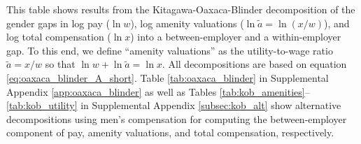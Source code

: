 %
\begin{table}[htbp!]
    \caption{Kitagawa-Oaxaca-Blinder decompositions of gaps in pay, amenity valuations, and total compensation}
    \label{tab:oaxaca_blinder_all}
    \resizebox{\textwidth}{!}{%
    
    }
    \begin{tablenotes}
        \footnotesize
        This table shows results from the Kitagawa-Oaxaca-Blinder decomposition of the gender gaps in log pay ($\ln w$), log amenity valuations ($\ln \tilde{a} = \ln(x/w)$), and log total compensation ($\ln x$) into a between-employer and a within-employer gap. To this end, we define ``amenity valuations'' as the utility-to-wage ratio $\tilde{a} = x/w$ so that $\ln w + \ln \tilde{a} = \ln x$. All decompositions are based on equation \eqref{eq:oaxaca_blinder_A_short}. Table \ref{tab:oaxaca_blinder} in Supplemental Appendix \ref{app:oaxaca_blinder} as well as Tables \ref{tab:kob_amenities}--\ref{tab:kob_utility} in Supplemental Appendix \ref{subsec:kob_alt} show alternative decompositions using men's compensation for computing the between-employer component of pay, amenity valuations, and total compensation, respectively. %
    \end{tablenotes}
    \begin{tablenotes}[Source]
        \sourcemodel%
    \end{tablenotes}
\end{table}
%

